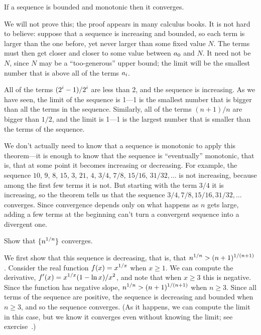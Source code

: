 \begin{theorem} If a sequence is bounded and monotonic then it converges.
\end{theorem}

We will not prove this; the proof appears in many calculus books. It
is not hard to believe: suppose that a sequence is increasing and
bounded, so each term is larger than the one before, yet never larger
than some fixed value $N$. The terms must then get closer and closer
to some value between $\displaystyle a_0$ and $N$. It need not be $N$, since $N$ may
be a ``too-generous'' upper bound; the limit will be the
smallest number that is above all of the terms $\displaystyle a_i$.

\begin{example}
All of the terms $\displaystyle (2^i-1)/2^i$ are less than 2, and the sequence is
increasing. As we have seen, the limit of the sequence is 1---1 is the
smallest number that is bigger than all the terms in the sequence.
Similarly, all of the terms $(n+1)/n$ are bigger than $1/2$, and the
limit is 1---1 is the largest number that is smaller than the terms of
the sequence.
\end{example}

We don't actually need to know that a sequence is monotonic to apply
this theorem---it is enough to know that the sequence is
``eventually'' monotonic, that is, that at some point it becomes
increasing or decreasing. For example, the sequence $10$, $9$, $8$,
$15$, $3$, $21$, $4$, $3/4$, $7/8$, $15/16$, $31/32,\ldots$ is not
increasing, because among the first few terms it is not. But starting
with the term $3/4$ it is increasing, so the theorem tells us that the
sequence $3/4, 7/8, 15/16, 31/32,\ldots$ converges.  Since convergence
depends only on what happens as $n$ gets large, adding a few
terms at the beginning can't turn a convergent sequence into a
divergent one.

\begin{example}
Show that $\displaystyle\{n^{1/n}\}$ converges. 
\par\nobreak\ssk\noindent
We first show that 
this sequence is decreasing, that is, that $\displaystyle n^{1/n}>
(n+1)^{1/(n+1)}$. Consider the real function $\displaystyle f(x)=x^{1/x}$ when
$x\ge1$. We can compute the derivative, $\displaystyle f'(x)=x^{1/x}(1-\ln x)/x^2$,
and note that when $x\ge 3$ this is negative. Since the function has
negative slope, $\displaystyle n^{1/n}>
(n+1)^{1/(n+1)}$ when $n\ge 3$. Since all terms of the sequence are
positive, the sequence is decreasing and bounded when $n\ge3$, and so
the sequence converges. (As it happens, we can compute the limit in
this case, but we know it converges even without knowing the limit; see
exercise~.)
\end{example}

